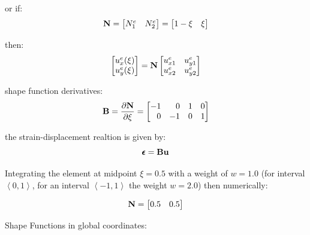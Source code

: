 or if:
\begin{equation}
    \mathbf{N} = \begin{bmatrix}
        N_1^e & N_2^e \\
    \end{bmatrix}
    = \begin{bmatrix}
        1 - \xi & \xi \\
    \end{bmatrix}
\end{equation}

then:
\begin{equation}
    \begin{bmatrix}
        u_x^e(\xi) \\
        u_y^e(\xi) \\
    \end{bmatrix}
    = \mathbf{N} \begin{bmatrix}
        u_{x1}^e & u_{y1}^e \\
        u_{x2}^e & u_{y2}^e \\
    \end{bmatrix}
\end{equation}

shape function derivatives:
\begin{equation}
    \mathbf{B} = \frac{\partial \mathbf{N}}{\partial \xi} =
    \begin{bmatrix}
        -1 & \phantom{-}0 & 1 & 0 \\
        \phantom{-}0 & -1 & 0 & 1  \\
    \end{bmatrix}
\end{equation}

the strain-displacement realtion is given by:
\begin{equation}
    \pmb{\epsilon} = \mathbf{B} \mathbf{u}
\end{equation}

Integrating the element at midpoint $ \xi = 0.5 $ with a weight of $ w = 1.0 $
(for interval $ \left< 0, 1 \right> $, for an interval
$ \left< -1,  1 \right> $ the weight $ w = 2.0 $)
then numerically:

\begin{equation}
    \mathbf{N} = \begin{bmatrix}
        0.5 & 0.5 \\
    \end{bmatrix}
\end{equation}

Shape Functions in global coordinates:

